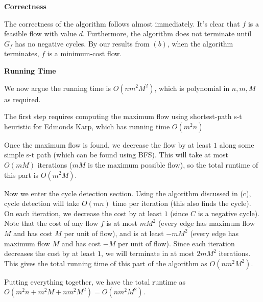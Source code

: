 \documentclass[12pt]{exam}
\begin{document}
\begin{questions}
\begin{solution}
\begin{enumerate}[label=(\alph*)]
      \textbf{Correctness}

      The correctness of the algorithm follows almost immediately. It's clear that $f$ is a feasible flow with value $d$. Furthermore, the algorithm does not terminate until $G_f$ has no negative cycles. By our results from $(b)$, when the algorithm terminates, $f$ is a minimum-cost flow.

      \textbf{Running Time}

      We now argue the running time is $O(nm^2M^2)$, which is polynomial in $n,m,M$ as required.

      The first step requires computing the maximum flow using shortest-path s-t heuristic for Edmonds Karp, which has running time $O(m^2n)$

      Once the maximum flow is found, we decrease the flow by at least $1$ along some simple s-t path (which can be found using BFS). This will take at most $O(mM)$ iterations ($mM$ is the maximum possible flow), so the total runtime of this part is $O(m^2M)$.

      Now we enter the cycle detection section. Using the algorithm discussed in (c), cycle detection will take $O(mn)$ time per iteration (this also finds the cycle). On each iteration, we decrease the cost by at least $1$ (since $C$ is a negative cycle). Note that the cost of any flow $f$ is at most $mM^2$ (every edge has maximum flow $M$ and has cost $M$ per unit of flow), and is at least $-mM^2$ (every edge has maximum flow $M$ and has cost $-M$ per unit of flow). Since each iteration decreases the cost by at least $1$, we will terminate in at most $2mM^2$ iterations. This gives the total running time of this part of the algorithm as $O(nm^2M^2)$.

      Putting everything together, we have the total runtime as $O(m^2n + m^2M + nm^2M^2) = O(nm^2M^2)$.

  \end{enumerate}
\end{solution}

\end{questions}
\end{document}
